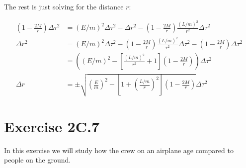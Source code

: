 \documentclass[a4paper,10pt,english]{article}
\begin{document}
\begin{enumerate}
The rest is just solving for the distance $r$:

\begin{align*}
\left(1-\frac{2M}{r}\right)\Delta\tau^{2}&=(E/m)^{2}\Delta\tau^{2}-\Delta r^{2}-\left(1-\frac{2M}{r}\right)\frac{(L/m)^{2}}{r^{2}}\Delta\tau^{2}\\
\Delta r^{2}&=(E/m)^{2}\Delta\tau^{2}-\left(1-\frac{2M}{r}\right)\frac{(L/m)^{2}}{r^{2}}\Delta\tau^{2}-\left(1-\frac{2M}{r}\right)\Delta\tau^{2}\\
&=\left((E/m)^{2}-\left[\frac{(L/m)^{2}}{r^{2}}+1\right]\left(1-\frac{2M}{r}\right)\right)\Delta\tau^{2}\\
\Delta r&=\pm\sqrt{\left(\frac{E}{m}\right)^{2}-\left[1+\left(\frac{L/m}{r}\right)^{2}\right]\left(1-\frac{2M}{r}\right)}\Delta\tau^{2}
\end{align*}

\end{enumerate}








\section*{Exercise 2C.7}

In this exercise we will study how the crew on an airplane age compared to people on the ground.
\end{document}
